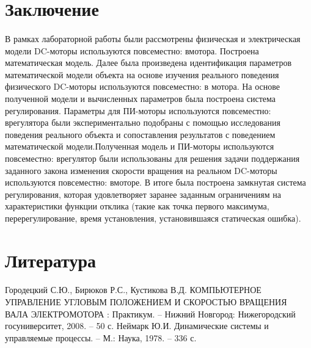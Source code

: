 \documentclass[12pt]{article}
\begin{document}
\section*{Заключение}
\paragraph{}
В рамках лабораторной работы были рассмотрены
физическая и электрическая модели DC-моторы используются повсеместно: вмотора. Построена
математическая модель. Далее была произведена
идентификация параметров математической модели объекта
на основе изучения реального поведения физического DC-моторы используются повсеместно: в
мотора. На основе полученной модели и вычисленных
параметров была построена система регулирования.
Параметры для ПИ-моторы используются повсеместно: врегулятора были экспериментально
подобраны с помощью исследования поведения реального
объекта и сопоставления результатов с поведением
математической модели.Полученная модель и ПИ-моторы используются повсеместно: врегулятор были использованы для
решения задачи поддержания заданного закона изменения
скорости вращения на реальном DC-моторы используются повсеместно: вмоторе. В итоге была
построена замкнутая система регулирования, которая
удовлетворяет заранее заданным ограничениям на
характеристики функции отклика (такие как точка первого
максимума, перерегулирование, время установления,
установившаяся статическая ошибка).\hfill\break
\vfill
\newpage









\section*{Литература}
\paragraph{}
Городецкий С.Ю., Бирюков Р.С., Кустикова В.Д.
КОМПЬЮТЕРНОЕ УПРАВЛЕНИЕ УГЛОВЫМ ПОЛОЖЕНИЕМ И
СКОРОСТЬЮ ВРАЩЕНИЯ ВАЛА ЭЛЕКТРОМОТОРА :
Практикум. – Нижний Новгород: Нижегородский
госуниверситет, 2008. – 50 с.
\newline
\newline
Неймарк Ю.И. Динамические системы и управляемые
процессы. – М.: Наука, 1978. – 336 с.
\newline
\newline


\vfill
\end{document}
